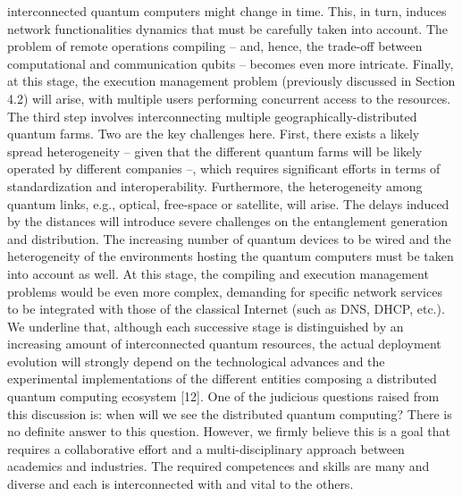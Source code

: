 interconnected quantum computers might change in time. This, in turn, induces network functionalities dynamics that must be carefully taken into account. The problem of remote operations compiling – and, hence, the trade-off between computational and communication qubits – becomes even more intricate. Finally, at this stage, the execution management problem (previously discussed in Section 4.2) will arise, with multiple users performing concurrent access to the resources. The third step involves interconnecting multiple geographically-distributed quantum farms. Two are the key challenges here. First, there exists a likely spread heterogeneity – given that the different quantum farms will be likely operated by different companies –, which requires significant efforts in terms of standardization and interoperability. Furthermore, the heterogeneity among quantum links, e.g., optical, free-space or satellite, will arise. The delays induced by the distances will introduce severe challenges on the entanglement generation and distribution. The increasing number of quantum devices to be wired and the heterogeneity of the environments hosting the quantum computers must be taken into account as well. At this stage, the compiling and execution management problems would be even more complex, demanding for specific network services to be integrated with those of the classical Internet (such as DNS, DHCP, etc.). We underline that, although each successive stage is distinguished by an increasing amount of interconnected quantum resources, the actual deployment evolution will strongly depend on the technological advances and the experimental implementations of the different entities composing a distributed quantum computing ecosystem [12]. One of the judicious questions raised from this discussion is: when will we see the distributed quantum computing? There is no definite answer to this question. However, we firmly believe this is a goal that requires a collaborative effort and a multi-disciplinary approach between academics and industries. The required competences and skills are many and diverse and each is interconnected with and vital to the others.